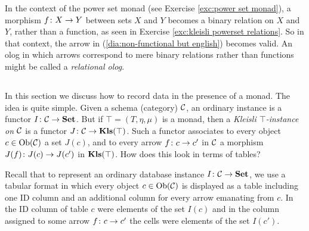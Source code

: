 \documentclass[CT4S-EN-RU]{subfiles}
\begin{document}
\begin{blockRUS}
\end{blockRUS}

\begin{blockENG}
In the context of the power set monad (see Exercise \ref{exc:power set monad}), a morphism $f\colon X\rightarrow Y$ between sets $X$ and $Y$ becomes a binary relation on $X$ and $Y$, rather than a function, as seen in Exercise \ref{exc:kleisli powerset relations}. So in that context, the arrow in (\ref{dia:non-functional but english}) becomes valid. An olog in which arrows correspond to mere binary relations rather than functions might be called a {\em relational olog}.
\end{blockENG}

\begin{blockRUS}
\end{blockRUS}


\subsection{}\label{sec:monads in db}

\begin{blockENG}
In this section we discuss how to record data in the presence of a monad. The idea is quite simple. Given a schema (category) $\mathcal{C}$, an ordinary instance is a functor $I\colon\mathcal{C}\rightarrow{\mathbf{Set}}$. But if $\top=(T,\eta,\mu)$ is a monad, then a {\em Kleisli $\top$-instance on $\mathcal{C}$} is a functor $J\colon\mathcal{C}\rightarrow{\mathbf{Kls}}(\top)$. Such a functor associates to every object $c\in\textnormal{Ob}(\mathcal{C})$ a set $J(c)$, and to every arrow $f\colon c\rightarrow c'$ in $\mathcal{C}$ a morphism $J(f)\colon J(c)\rightarrow J(c')$ in ${\mathbf{Kls}}(\top)$. How does this look in terms of tables?
\end{blockENG}

\begin{blockRUS}
\end{blockRUS}

\begin{blockENG}
Recall that to represent an ordinary database instance $I\colon\mathcal{C}\rightarrow{\mathbf{Set}}$, we use a tabular format in which every object $c\in\textnormal{Ob}(\mathcal{C})$ is displayed as a table including one ID column and an additional column for every arrow emanating from $c$. In the ID column of table $c$ were elements of the set $I(c)$ and in the column assigned to some arrow $f\colon c\rightarrow c'$ the cells were elements of the set $I(c')$. 
\end{blockENG}
\end{document}
